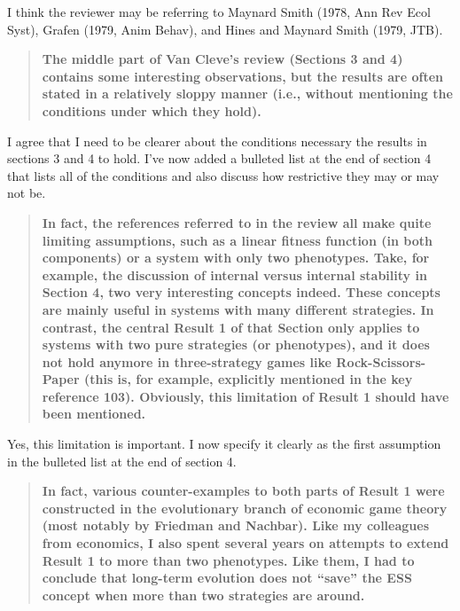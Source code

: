 \documentclass[10pt,parskip=full,foldmarks=off,addrfield=off,backaddress=false,refline=dateleft,letterpaper]{scrlttr2}
\newenvironment{reviewerquote}{\begin{quote}\color{DarkBlue}\bfseries}{\end{quote}}
\begin{document}
\begin{letter}
I think the reviewer may be referring to Maynard Smith (1978, Ann Rev Ecol Syst), Grafen (1979, Anim Behav), and Hines and Maynard Smith (1979, JTB).

\begin{reviewerquote}
  The middle part of Van Cleve’s review (Sections 3 and 4) contains some interesting observations, but the results are often stated in a relatively sloppy manner (i.e., without mentioning the conditions under which they hold).
\end{reviewerquote}

I agree that I need to be clearer about the conditions necessary the results in sections 3 and 4 to hold. I've now added a bulleted list at the end of section 4 that lists all of the conditions and also discuss how restrictive they may or may not be.

\begin{reviewerquote}
  In fact, the references referred to in the review all make quite limiting assumptions, such as a linear fitness function (in both components) or a system with only two phenotypes. Take, for example, the discussion of internal versus internal stability in Section 4, two very interesting concepts indeed. These concepts are mainly useful in systems with many different strategies. In contrast, the central Result 1 of that Section only applies to systems with two pure strategies (or phenotypes), and it does not hold anymore in three-strategy games like Rock-Scissors-Paper (this is, for example, explicitly mentioned in the key reference 103). Obviously, this limitation of Result 1 should have been mentioned.
\end{reviewerquote}

Yes, this limitation is important. I now specify it clearly as the first assumption in the bulleted list at the end of section 4.

\begin{reviewerquote}
  In fact, various counter-examples to both parts of Result 1 were constructed in the evolutionary branch of economic game theory (most notably by Friedman and Nachbar). Like my colleagues from economics, I also spent several years on attempts to extend Result 1 to more than two phenotypes. Like them, I had to conclude that long-term evolution does not “save” the ESS concept when more than two strategies are around.
\end{reviewerquote}




\end{letter}
\end{document}
